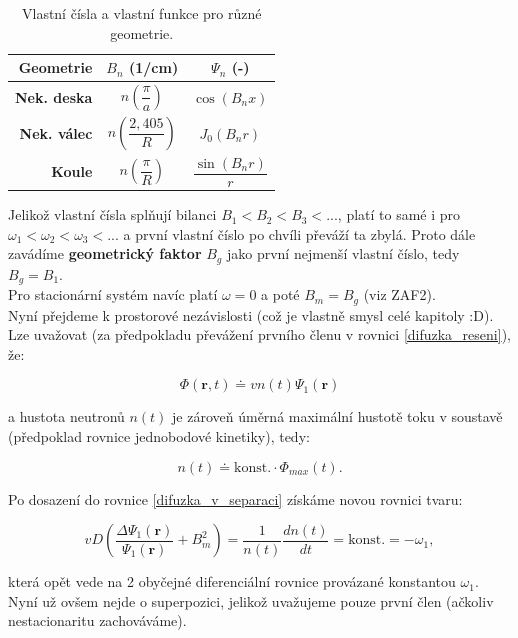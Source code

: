 \begin{table}[H]
\centering
\caption{Vlastní čísla a vlastní funkce pro různé geometrie.}
\label{table_vlastni_funkce}
\begin{tabular}{@{}rcc@{}}
\toprule
\textbf{Geometrie}   & $B_n$ (1/cm)         & $\Psi_n$ (-)                               \\ \midrule
\textbf{Nek. deska}  & $n \left ( \dfrac{\pi}{a} \right )$   & $\cos(B_nx)$              \\ [15pt]
\textbf{Nek. válec}  & $n \left ( \dfrac{2,405}{R} \right )$ & $J_0(B_nr)$               \\ [15pt]
\textbf{Koule}       & $n \left ( \dfrac{\pi}{R} \right )$   & $\dfrac{\sin(B_nr)}{r}$   \\ \bottomrule
\end{tabular}
\end{table}

Jelikož vlastní čísla splňují bilanci $B_1 < B_2 < B_3 < ...$, platí to samé i pro $\omega_1 < \omega_2 < \omega_3 < ...$ a první vlastní číslo po chvíli převáží ta zbylá. Proto dále zavádíme \textbf{geometrický faktor} $B_g$ jako první nejmenší vlastní číslo, tedy $B_g = B_1$.\\

Pro stacionární systém navíc platí $\omega = 0$ a poté $B_m = B_g$ (viz ZAF2).\\

Nyní přejdeme k prostorové nezávislosti (což je vlastně smysl celé kapitoly :D). Lze uvažovat (za předpokladu převážení prvního členu v rovnici \eqref{difuzka_reseni}), že:

$$ \Phi (\textbf{r}, t) \doteq v n(t) \Psi_1 (\textbf{r}) $$

a hustota neutronů $n(t)$ je zároveň úměrná maximální hustotě toku v soustavě (předpoklad rovnice jednobodové kinetiky), tedy:

$$ n(t) \doteq \text{konst.} \cdot \Phi_{max} (t). $$

Po dosazení do rovnice \eqref{difuzka_v_separaci} získáme novou rovnici tvaru:

\begin{equation}
  v D \left ( \dfrac{\Delta \Psi_1 (\textbf{r})}{\Psi_1 (\textbf{r})} + B_m^2 \right ) = \dfrac{1}{n(t)} \dfrac{d n(t)}{d t} = \text{konst.} = - \omega_1,
  \label{rovnice_kinetiky_v_separaci}
\end{equation}

která opět vede na 2 obyčejné diferenciální rovnice provázané konstantou $\omega_1$. Nyní už ovšem nejde o superpozici, jelikož uvažujeme pouze první člen (ačkoliv nestacionaritu zachováváme).\\

